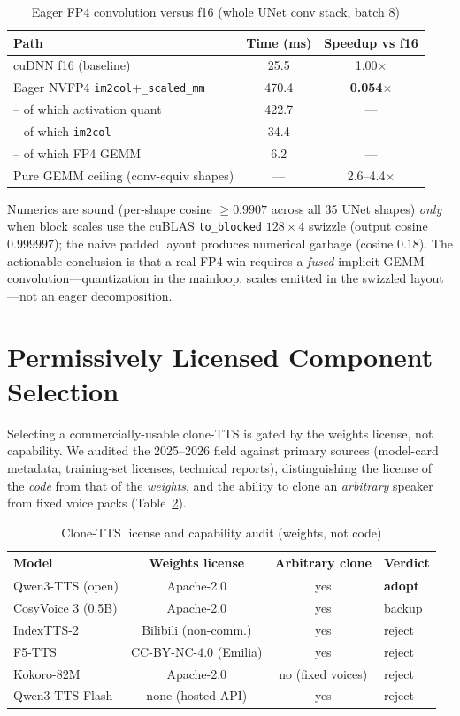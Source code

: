 \documentclass[11pt,a4paper]{article}
\begin{document}
\begin{table}[H]
\centering
\caption{Eager FP4 convolution versus f16 (whole UNet conv stack, batch 8)}
\label{tab:fp4}
\begin{tabular}{lcc}
\toprule
Path & Time (ms) & Speedup vs f16 \\
\midrule
cuDNN f16 (baseline) & 25.5 & 1.00$\times$ \\
Eager NVFP4 \texttt{im2col}+\texttt{\_scaled\_mm} & 470.4 & \textbf{0.054$\times$} \\
\;\;-- of which activation quant & 422.7 & --- \\
\;\;-- of which \texttt{im2col} & 34.4 & --- \\
\;\;-- of which FP4 GEMM & 6.2 & --- \\
Pure GEMM ceiling (conv-equiv shapes) & --- & 2.6--4.4$\times$ \\
\bottomrule
\end{tabular}
\end{table}

Numerics are sound (per-shape cosine $\geq 0.9907$ across all 35 UNet shapes) \emph{only} when block scales use the cuBLAS \texttt{to\_blocked} $128\times4$ swizzle (output cosine $0.999997$); the naive padded layout produces numerical garbage (cosine $0.18$). The actionable conclusion is that a real FP4 win requires a \emph{fused} implicit-GEMM convolution---quantization in the mainloop, scales emitted in the swizzled layout---not an eager decomposition.

\section{Permissively Licensed Component Selection}

Selecting a commercially-usable clone-TTS is gated by the weights license, not capability. We audited the 2025--2026 field against primary sources (model-card metadata, training-set licenses, technical reports), distinguishing the license of the \emph{code} from that of the \emph{weights}, and the ability to clone an \emph{arbitrary} speaker from fixed voice packs (Table~\ref{tab:license}).

\begin{table}[H]
\centering
\caption{Clone-TTS license and capability audit (weights, not code)}
\label{tab:license}
\begin{tabular}{lccl}
\toprule
Model & Weights license & Arbitrary clone & Verdict \\
\midrule
Qwen3-TTS (open) & Apache-2.0 & yes & \textbf{adopt} \\
CosyVoice 3 (0.5B) & Apache-2.0 & yes & backup \\
IndexTTS-2 & Bilibili (non-comm.) & yes & reject \\
F5-TTS & CC-BY-NC-4.0 (Emilia) & yes & reject \\
Kokoro-82M & Apache-2.0 & no (fixed voices) & reject \\
Qwen3-TTS-Flash & none (hosted API) & yes & reject \\
\bottomrule
\end{tabular}
\end{table}
\end{document}
